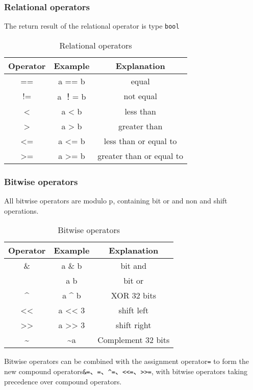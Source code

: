 \subsubsection*{Relational operators}

The return result of the relational operator is type \texttt{bool}

\begin{table}
\centering
\begin{tabular}{c|c|c}
Operator & Example & Explanation \\ \hline
== & a == b & equal \\
!= & a ！= b & not equal \\
< & a < b & less than \\
> & a > b & greater than \\
<= & a <= b & less than or equal to \\
>= & a >= b & greater than or equal to \\
\end{tabular}
\caption{Relational operators}
\end{table}

\subsubsection*{Bitwise operators}

All bitwise operators are modulo p, containing bit or and non and shift operations.
\begin{table}
\centering
\begin{tabular}{c|c|c}
    Operator & Example & Explanation \\ \hline
    \& & a \& b & bit and \\
    \textbar{} & a \textbar{} b & bit or \\
    \textasciicircum{} & a \textasciicircum{} b & XOR 32 bits \\
    << & a << 3 & shift left \\
    >> & a >> 3 & shift right \\
    \textasciitilde{} & \textasciitilde{}a & Complement 32  bits \\
\end{tabular}
\caption{Bitwise operators}
\end{table}

Bitwise operators can be combined with the assignment operator\texttt{=} to form the new compound operators\texttt{\&=}、\texttt{\textbar=}、\texttt{\textasciicircum=}、\texttt{<<=}、\texttt{>>=}, 
with bitwise operators taking precedence over compound operators.

